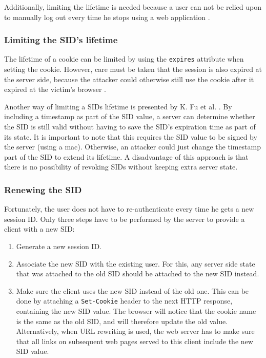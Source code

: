 Additionally, limiting the lifetime is needed because a user can not be relied upon to manually log out every time he stops using a web application \cite{OWASP2009a}. %

\subsubsection{Limiting the SID's lifetime}
The lifetime of a cookie can be limited by using the \texttt{expires} attribute when setting the cookie. However, care must be taken that the session is also expired at the server side, because the attacker could otherwise still use the cookie after it expired at the victim's browser \cite{Kolsek2002}.

Another way of limiting a SIDs lifetime is presented by K. Fu et al. \cite{Fu2001}. By including a timestamp as part of the SID value, a server can determine whether the SID is still valid without having to save the SID's expiration time as part of its state. It is important to note that this requires the SID value to be signed by the server (using a \gls{mac}). Otherwise, an attacker could just change the timestamp part of the SID to extend its lifetime. A disadvantage of this approach is that there is no possibility of revoking SIDs without keeping extra server state.

\subsubsection{Renewing the SID}
Fortunately, the user does not have to re-authenticate every time he gets a new session ID. Only three steps have to be performed by the server to provide a client with a new SID:
\begin{enumerate}
	\item Generate a new session ID.
	\item Associate the new SID with the existing user. For this, any server side state that was attached to the old SID should be attached to the new SID instead.
	\item Make sure the client uses the new SID instead of the old one. This can be done by attaching a \texttt{Set-Cookie} header to the next HTTP response, containing the new SID value. The browser will notice that the cookie name is the same as the old SID, and will therefore update the old value. Alternatively, when URL rewriting is used, the web server has to make sure that all links on subsequent web pages served to this client include the new SID value.
\end{enumerate}


